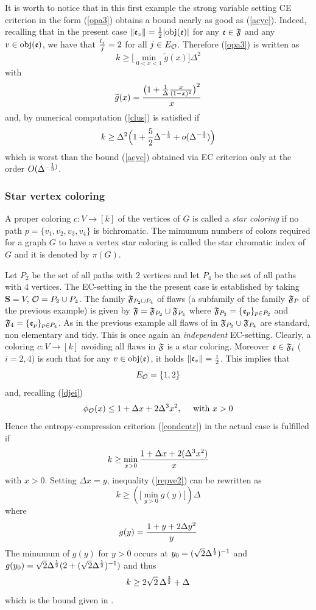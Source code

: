 \documentclass[11pt]{article}
\let\D=\Delta \let\F=\Phi \let\G=\Gamma \let\L=\Lambda \let\Th=\Theta
\let\\=\noindent
\def\ee{\end{equation}}
\def\be{\begin{equation}}
\begin{document}
\noindent
It is worth to notice that in this first example the strong variable setting CE criterion in the form (\ref{opa3})
obtains a bound
nearly as good as (\ref{acyc}). Indeed, recalling that  in the present case $\|{\mathfrak{e}}_v\|={1\over 2}|{\rm obj}({\mathfrak{e}})|$
for any  ${\mathfrak{e}}\in {\mathfrak{F}}$  and any $v\in {\rm obj}({\mathfrak{e}})$,   we have that ${l_j\over j}=2$
for all $j\in E_{{\mathcal O}}$.  Therefore
(\ref{opa3}) is written as
\be\label{clus}
{k}\ge \Big[\min_{0<x<1}\widetilde g(x)\Big]\D^2
\ee
with
$$
\widetilde g(x)={\big(1+ {1\over \D}{x\over (1-x)^2}\big)^2\over x}
$$
and, by numerical computation (\ref{clus}) is satisfied if
$$
k\ge \D^2\Big( 1+ {5\over 2} \D^{-{1\over 3}}+o(\D^{-{1\over 3}})\Big)
$$
which is  worst than the   bound  (\ref{acyc}) obtained via EC criterion only at the order $O(\D^{-{1\over 3})}$.


\subsubsection{Star vertex coloring}
A proper coloring $c: V\to [k]$ of the vertices of $G$ is called
a {\it star coloring} if no path $p=\{v_1,v_2,v_3,v_4\}$
is bichromatic. The mimumum numbers of colors required
for a graph $G$ to have a vertex star coloring is called the star chromatic index of $G$ and  it is denoted by $\pi(G)$.

\\Let $P_2$   be the set of all paths with $2$ vertices and let $P_4$ be the set of all paths with $4$ vertices.
The EC-setting in the the present case  is established by taking $\mathbf{S}=V$, ${{\mathcal O}}=P_2\cup P_4$. The family ${\mathfrak{F}}_{P_2\cup P_4}$ of flaws
(a subfamily of the family ${\mathfrak{F}}_P$ of the previous example) is  given by
${\mathfrak{F}}= {\mathfrak{F}}_{P_2}\cup{\mathfrak{F}}_{P_4}$
where
${\mathfrak{F}}_{P_2}= \{{\mathfrak{e}}_p\}_{p\in P_2}$ and ${\mathfrak{F}}_4 = \{{\mathfrak{e}}_p\}_{p\in P_4}$.
As in the previous example all flaws of in ${\mathfrak{F}}_{P_2}\cup{\mathfrak{F}}_{P_4}$ are standard,  non elementary and  tidy. This is once again an {\it independent} EC-setting.
Clearly, a coloring $c: V\to [k]$  avoiding all   flaws in ${\mathfrak{F}}$ is a star coloring.
 Moreover ${\mathfrak{e}}\in {\mathfrak{F}}_{i}$ ($i=2,4$) is
such that  for any $v\in {\rm obj}({\mathfrak{e}})$,  it holds  $\|{\mathfrak{e}}_v\|={i\over 2}$.
This implies that
$$
E_{{\mathcal O}}= \{1,2\}
$$
and, recalling (\ref{djei})
$$
\phi_\A(x)\le 1+\D x+2\D^{3}x^2,  ~~~~ \mbox{with $x>0$}
$$
Hence the entropy-compression criterion  (\ref{condentr}) in the actual case is fulfilled if
\be\label{repve2}
k\ge \min_{x>0}{1+\D x+2(\D^{3}x^2)\over x}
\ee
with $x>0$.
Setting $\D x=y$, inequality (\ref{repve2}) can be rewritten as
\be\label{estar}
{k}\ge \left(\Big[\min_{y>0}g(y)\Big]\right)\D
\ee
where
$$
g(y)={1+y+ 2\D y^2\over y}
$$
The minumum of $g(y)$  for $y>0$  occurs at $y_0=(\sqrt{2}\D^{1\over 2})^{-1}$ and $g(y_0)=\sqrt{2}\D^{1\over 2}(2+(\sqrt{2}\D^{1\over 2})^{-1})$
and thus
\be\label{astar}
k\ge 2\sqrt{2}\,\D^{3\over 2}+\D
\ee
which is the  bound given in \cite{EP}.
\end{document}
